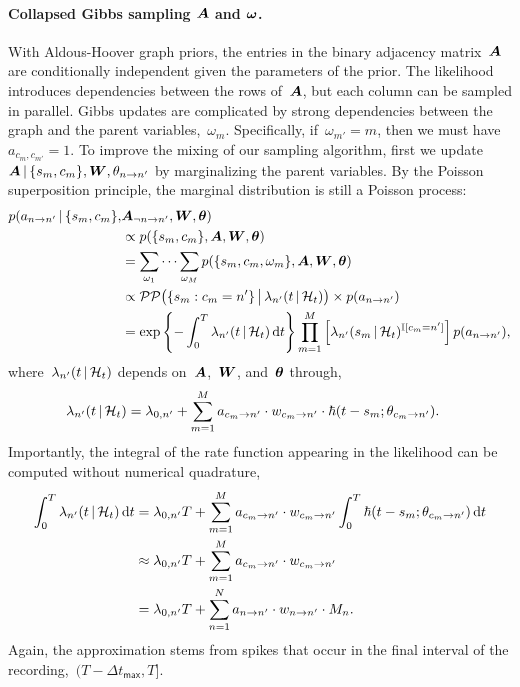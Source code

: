 \paragraph{Collapsed Gibbs sampling $\boldsymbol{A}$ and $\boldsymbol{\omega}$.}
With Aldous-Hoover graph priors, the entries in the binary adjacency
matrix~$\boldsymbol{A}$ are conditionally independent given the parameters of the
prior. The likelihood introduces dependencies between the rows
of~$\boldsymbol{A}$, but each column can be sampled in parallel. Gibbs updates
are complicated by strong dependencies between the graph and the
parent variables,~$\omega_m$. Specifically, if~${\omega_{m'}=m}$, then
we must have~${a_{c_{m},c_{m'}}=1}$. To improve the mixing of our
sampling algorithm, first we
update~${\boldsymbol{A}\,|\,\{s_m,c_m\},\boldsymbol{W},\theta_{n \to n'}}$ by marginalizing
the parent variables. By the Poisson superposition principle, the marginal
distribution is still a Poisson process:
\begin{align*}
  p(a_{n \to n'} \,|\, \{s_m, c_m\}, &\boldsymbol{A}_{\neg n \to n'}, \boldsymbol{W}, \boldsymbol{\theta}) \\
  &\propto p(\{s_m, c_m\}, \boldsymbol{A}, \boldsymbol{W}, \boldsymbol{\theta}) \\
  &= \sum_{\omega_1} \cdots \sum_{\omega_M} p(\{s_m, c_m, \omega_m\}, \boldsymbol{A}, \boldsymbol{W}, \boldsymbol{\theta}) \\
  &\propto \mathcal{PP} \big(\{s_m: c_m=n'\} \, \big| \, \lambda_{n'}(t \,|\, \mathcal{H}_t)\big)
  \times p(a_{n \to n'}) \\
  &= \exp \left \{ -\int_0^T \lambda_{n'}(t \,|\, \mathcal{H}_t) \, \mathrm{d}t \right\}
  \prod_{m=1}^M \left[ \lambda_{n'}(s_m \,|\, \mathcal{H}_t)^{\mathbb{I}[c_m=n']} \right]
  p(a_{n \to n'}),
\end{align*}
where~$\lambda_{n'}(t \,|\, \mathcal{H}_t)$ depends on~$\boldsymbol{A}$,~$\boldsymbol{W}$, and~$\boldsymbol{\theta}$
through,
\begin{align*}
  \lambda_{n'}(t \,|\, \mathcal{H}_t) &= \lambda_{0,n'} +
  \sum_{m=1}^M a_{c_m \to n'} \cdot w_{c_m \to n'} \cdot \hbar(t-s_m; \theta_{c_m \to n'}).
\end{align*}
Importantly, the integral of the rate function appearing in the
likelihood can be computed without numerical quadrature,
\begin{align*}
  \int_0^T \lambda_{n'}(t \,|\, \mathcal{H}_t) \, \mathrm{d}t
  &= \lambda_{0,n'} T +
  \sum_{m=1}^M a_{c_m \to n'} \cdot w_{c_m \to n'}
  \int_0^T  \hbar(t-s_m; \theta_{c_m \to n'}) \, \mathrm{d}t \\
  &\approx \lambda_{0,n'} T + \sum_{m=1}^M a_{c_m \to n'} \cdot w_{c_m \to n'} \\
  &= \lambda_{0,n'} T + \sum_{n=1}^N a_{n \to n'} \cdot w_{n \to n'} \cdot M_{n}.
\end{align*}
Again, the approximation stems from spikes that occur in the final
interval of the recording,~${(T-\Delta t_{\mathsf{max}}, T]}$.

